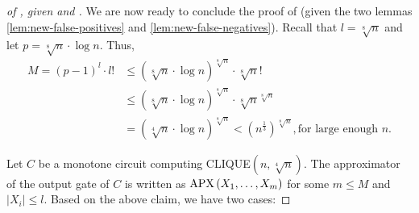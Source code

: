 \begin{proof}[of , given   and ]
We are now ready to conclude the proof of  (given the two lemmas \ref{lem:new-false-positives} and \ref{lem:new-false-negatives}).
Recall that $l=\sqrt[8]{n}$ and
let $p=\sqrt[8]{n} \cdot \log n$. 
Thus, 
\begin{equation}
\label{eq:651:16}
\begin{aligned}
M  = 
(p-1)^l \cdot l!
& \leq (\sqrt[8]{n} \cdot \log n)^{\sqrt[8]{n}} \cdot \sqrt[8]{n}! \\
& \leq (\sqrt[8]{n} \cdot \log n)^{\sqrt[8]{n}}
\cdot \sqrt[8]{n}^{\sqrt[8]{n}} \\
& =(\sqrt[4]{n} \cdot \log n)^{\sqrt[8]{n}}<
\left(n^{\frac{1}{3}}\right)^{\sqrt[8]{n}}, \text{
for large enough $n$.}
\end{aligned}
\end{equation}


Let $C$ be a monotone circuit computing CLIQUE$(n, \sqrt[4]{n})$.
%
%
%
The approximator of the output gate of $C$ is written as  $\operatorname{\mathrm{APX}}\left(X_1, \ldots, X_m\right)$ for some $m \leq M$ and $\left|X_i\right| \leq l$.
Based on the above claim, we have two cases:
\medskip 


\end{proof}
